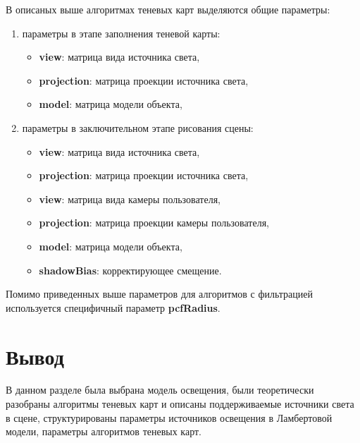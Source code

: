 В описаных выше алгоритмах теневых карт выделяются общие параметры:

\begin{enumerate}[label=\arabic*), labelsep=0.5em]
    \item параметры в этапе заполнения теневой карты:
    \begin{itemize}[label=---]
        \item \textbf{view}: матрица вида источника света,
        \item \textbf{projection}: матрица проекции источника света,
        \item \textbf{model}: матрица модели объекта,
    \end{itemize}
    \item параметры в заключительном этапе рисования сцены:
    \begin{itemize}[label=---]
        \item \textbf{view}: матрица вида источника света,
        \item \textbf{projection}: матрица проекции источника света,
        \item \textbf{view}: матрица вида камеры пользователя,
        \item \textbf{projection}: матрица проекции камеры пользователя,
        \item \textbf{model}: матрица модели объекта,
        \item \textbf{shadowBias}: корректирующее смещение.
    \end{itemize}
\end{enumerate}

Помимо приведенных выше параметров для алгоритмов с фильтрацией
используется специфичный параметр \textbf{pcfRadius}.

\section*{Вывод}

В данном разделе была выбрана модель освещения,
были теоретически разобраны алгоритмы теневых карт и
описаны поддерживаемые источники света в сцене,
структурированы параметры источников освещения в
Ламбертовой модели, параметры алгоритмов теневых карт.



